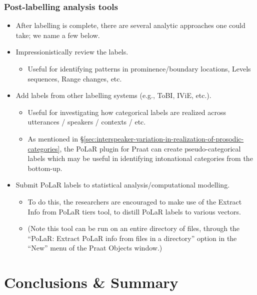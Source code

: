 \documentclass[11pt, twoside]{memoir}
\begin{document}
\subsection{Post-labelling analysis tools}
	\begin{itemize}
		\item After labelling is complete, there are several analytic approaches one could take; we name a few below.
		\item Impressionistically review the labels.
		\begin{itemize}
			\item Useful for identifying patterns in prominence\slash boundary locations, Levels sequences, Range changes, etc.
		\end{itemize}
		\item Add labels from other labelling systems (e.g., ToBI, IViE, etc.).
		\begin{itemize}
			\item Useful for investigating how categorical labels are realized across utterances / speakers / contexts / etc.
			\item As mentioned in §\ref{sec:interspeaker-variation-in-realization-of-prosodic-categories}, the PoLaR plugin for Praat can create pseudo-categorical labels which may be useful in identifying intonational categories from the bottom-up.
		\end{itemize}
		\item Submit PoLaR labels to statistical analysis\slash computational modelling.
		\begin{itemize}
			\item To do this, the researchers are encouraged to make use of the Extract Info from PoLaR tiers tool, to distill PoLaR labels to various vectors.
			\item (Note this tool can be run on an entire directory of files, through the “PoLaR: Extract PoLaR info from files in a directory” option in the “New” menu of the Praat Objects window.)
		\end{itemize}
	\end{itemize}







\chapter{Conclusions \& Summary}
\end{document}
